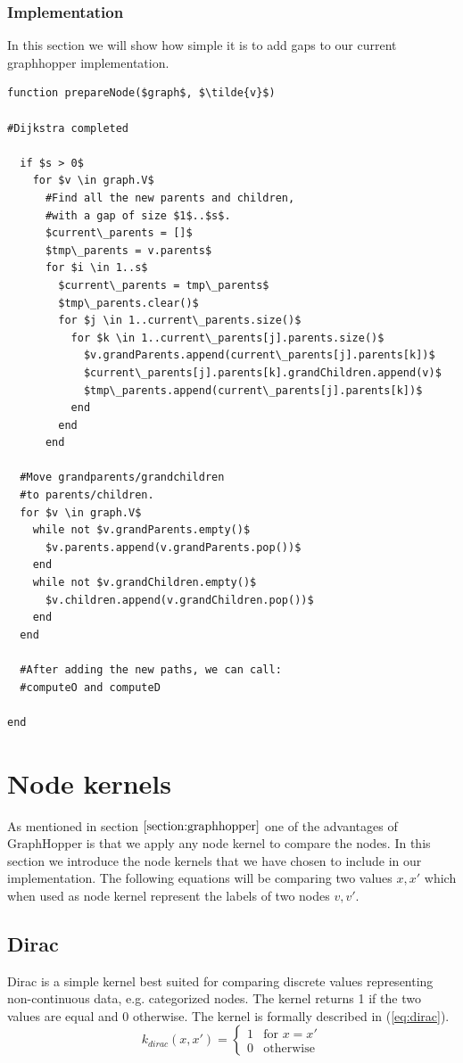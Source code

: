 \documentclass{article}
\begin{document}
\subsubsection{Implementation}
In this section we will show how simple it is to add gaps to our current graphhopper implementation.
\begin{lstlisting}
function prepareNode($graph$, $\tilde{v}$)

#Dijkstra completed

  if $s > 0$
    for $v \in graph.V$
      #Find all the new parents and children, 
      #with a gap of size $1$..$s$.
      $current\_parents = []$
      $tmp\_parents = v.parents$
      for $i \in 1..s$
        $current\_parents = tmp\_parents$
        $tmp\_parents.clear()$
        for $j \in 1..current\_parents.size()$
          for $k \in 1..current\_parents[j].parents.size()$
            $v.grandParents.append(current\_parents[j].parents[k])$
            $current\_parents[j].parents[k].grandChildren.append(v)$
            $tmp\_parents.append(current\_parents[j].parents[k])$
          end
        end
      end

  #Move grandparents/grandchildren
  #to parents/children.
  for $v \in graph.V$
    while not $v.grandParents.empty()$
      $v.parents.append(v.grandParents.pop())$
    end
    while not $v.grandChildren.empty()$
      $v.children.append(v.grandChildren.pop())$
    end
  end

  #After adding the new paths, we can call:
  #computeO and computeD

end
\end{lstlisting}

\section{Node kernels}
\label{section:node-kernels}
As mentioned in section $\ref{section:graphhopper}$ one of the advantages of GraphHopper is that we apply any node kernel to compare the nodes. In this section we introduce the node kernels that we have chosen to include in our implementation. The following equations will be comparing two values $x,x'$ which when used as node kernel represent the labels of two nodes $v,v'$.

\subsection{Dirac}
Dirac is a simple kernel best suited for comparing discrete values representing non-continuous data, e.g. categorized nodes. The kernel returns 1 if the two values are equal and 0 otherwise. The kernel is formally described in (\ref{eq:dirac}).
\begin{equation}
\label{eq:dirac}
k_{dirac}(x, x')=\begin{cases}
1 & \text{for }x=x'\\
0 & \text{otherwise}
\end{cases}
\end{equation}
\end{document}
